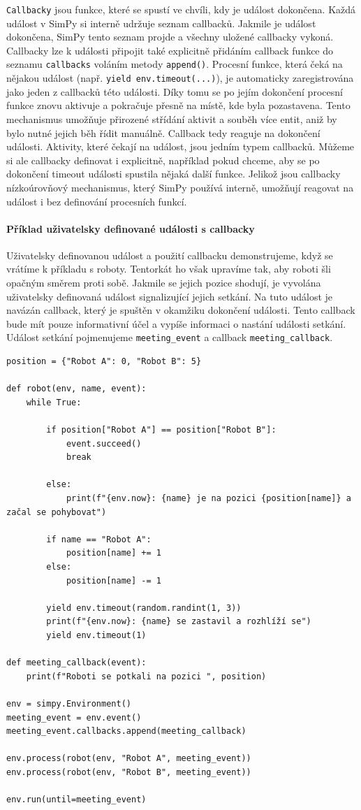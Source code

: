 \documentclass[
  program=itp,
  biblatex,
  figures=false,
  glossaries,
  index
]{kidiplom}
\begin{document}
\texttt{Callbacky} jsou funkce, které se spustí ve chvíli, kdy je událost dokončena. Každá událost v SimPy si interně udržuje seznam callbacků. Jakmile je událost dokončena, SimPy tento seznam projde a všechny uložené callbacky vykoná. Callbacky lze k události připojit také explicitně přidáním callback funkce do seznamu \texttt{callbacks} voláním metody \texttt{append()}. Procesní funkce, která čeká na nějakou událost (např. \texttt{yield env.timeout(...)}), je automaticky zaregistrována jako jeden z callbacků této události. Díky tomu se po jejím dokončení procesní funkce znovu aktivuje a pokračuje přesně na místě, kde byla pozastavena. Tento mechanismus umožňuje přirozené střídání aktivit a souběh více entit, aniž by bylo nutné jejich běh řídit manuálně. Callback tedy reaguje na dokončení události. Aktivity, které čekají na událost, jsou jedním typem callbacků. Můžeme si ale callbacky definovat i explicitně, například pokud chceme, aby se po dokončení timeout události spustila nějaká další funkce. Jelikož jsou callbacky nízkoúrovňový mechanismus, který SimPy používá interně, umožňují reagovat na událost i bez definování procesních funkcí.

\paragraph{Příklad uživatelsky definované události s callbacky}
Uživatelsky definovanou událost a použití callbacku demonstrujeme, když se vrátíme k příkladu s roboty. Tentorkát ho však upravíme tak, aby roboti šli opačným směrem proti sobě. Jakmile se jejich pozice shodují, je vyvolána uživatelsky definovaná událost signalizující jejich setkání. Na tuto událost je navázán callback, který je spuštěn v okamžiku dokončení události. Tento callback bude mít pouze informativní účel a vypíše informaci o nastání události setkání. Událost setkání pojmenujeme \texttt{meeting\_event} a callback \texttt{meeting\_callback}. 

\begin{verbatim}
position = {"Robot A": 0, "Robot B": 5}

def robot(env, name, event):
    while True:

        if position["Robot A"] == position["Robot B"]: 
            event.succeed()  
            break

        else:
            print(f"{env.now}: {name} je na pozici {position[name]} a začal se pohybovat")

        if name == "Robot A":
            position[name] += 1
        else:
            position[name] -= 1

        yield env.timeout(random.randint(1, 3))
        print(f"{env.now}: {name} se zastavil a rozhlíží se")
        yield env.timeout(1)

def meeting_callback(event):
    print(f"Roboti se potkali na pozici ", position)

env = simpy.Environment()
meeting_event = env.event()
meeting_event.callbacks.append(meeting_callback)

env.process(robot(env, "Robot A", meeting_event))
env.process(robot(env, "Robot B", meeting_event))

env.run(until=meeting_event)
\end{verbatim}
\end{document}
